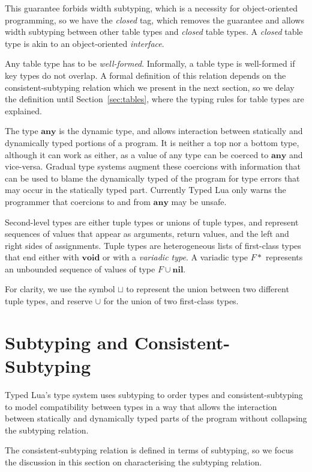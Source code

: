 \documentclass{sigplanconf}
\newcommand{\Any}{\mathbf{any}}
\newcommand{\Nil}{\mathbf{nil}}
\newcommand{\Void}{\mathbf{void}}
\begin{document}
This guarantee forbids width subtyping, which is a necessity
for object-oriented programming, so we have the {\em closed}
tag, which removes the guarantee and allows width subtyping
between other table types and {\em closed} table types. A {\em closed} table type is akin to an object-oriented {\em interface}.

Any table type has to be \emph{well-formed}.
Informally, a table type is well-formed if key types do not overlap. A formal definition of this relation depends on
the consistent-subtyping relation which we present in the
next section, so we delay the definition until Section~\ref{sec:tables}, where the typing rules for
table types are explained.

The type $\Any$ is the dynamic type, and allows
interaction between statically and dynamically typed
portions of a program. It is neither a top nor a bottom
type, although it can work as either, as a value of
any type can be coerced to $\Any$ and vice-versa.
Gradual type systems augment these coercions with
information that can be used to blame the dynamically
typed of the program for type errors that may occur in the
statically typed part. Currently Typed Lua only 
warns the programmer that coercions to and from $\Any$
may be unsafe.

Second-level types are either tuple types or unions of tuple types, and represent sequences of values that appear as arguments, return values, and the left and right sides of
assignments. Tuple types are heterogeneous lists of first-class
types that end either with $\Void$ or with a {\em variadic type}.
A variadic type $F{*}$ represents an unbounded sequence of values of type $F \cup \Nil$.

For clarity, we use the symbol $\sqcup$ to represent the union between two different tuple types, and reserve $\cup$ for the
union of two first-class types.

\section{Subtyping and Consistent-Subtyping}
\label{sec:subtyping}

Typed Lua's type system uses subtyping to order
types and  consistent-subtyping~\cite{siek2007objects,siek2013mutable}
to model compatibility between types in a way that allows
the interaction between statically and dynamically typed
parts of the program without collapsing the subtyping
relation.

The consistent-subtyping relation is defined in terms
of subtyping, so we focus the discussion in this section
on characterising the subtyping relation.
\end{document}
